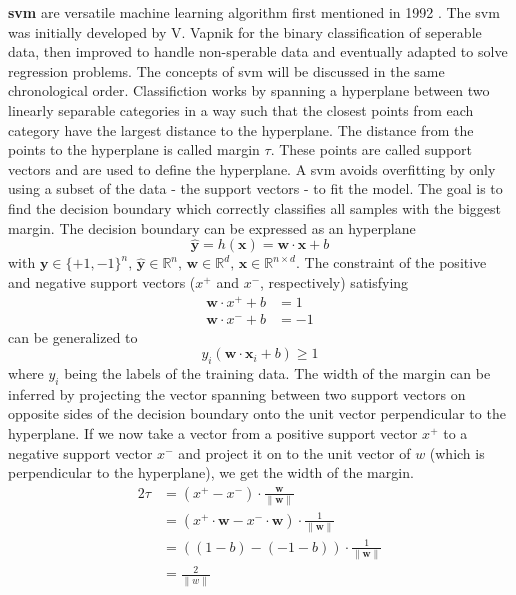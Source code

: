 \textbf{\Gls{svm}} are versatile machine learning algorithm first mentioned in 1992\cite{boser1992training} . 
%
The \gls{svm} was initially developed by V. Vapnik for the binary classification of seperable data, then improved to handle non-sperable data and eventually adapted to solve regression problems.
The concepts of \gls{svm} will be discussed in the same chronological order. 
%
Classifiction works by spanning a hyperplane between two linearly separable categories in a way such that the closest points from each category have the largest distance to the hyperplane. 
The distance from the points to the hyperplane is called margin $\tau$.
These points are called support vectors and are used to define the hyperplane.
A \gls{svm} avoids overfitting by only using a subset of the data - the support vectors - to fit the model. 
The goal is to find the decision boundary which correctly classifies all samples with the biggest margin. 
%
The decision boundary can be expressed as an hyperplane
\begin{equation}
	\hat{\mathbf{y}} = h(\mathbf{x}) = \mathbf{w} \cdot \mathbf{x} + b
\end{equation}
with $
\mathbf{y} \in \lbrace +1, -1 \rbrace^n ,\,
\hat{\mathbf{y}} \in \mathbb{R}^n ,\,
\mathbf{w} \in \mathbb{R}^d ,\,
\mathbf{x} \in \mathbb{R}^{n \times d} 
$.
The constraint of the positive and negative support vectors ($x^+$ and $x^-$, respectively) satisfying
\begin{align}
	\mathbf{w} \cdot x^+ + b &= 1 \\
	\mathbf{w} \cdot x^- + b &= -1 
\end{align}
can be generalized to 
\begin{equation}
	\label{eq:svm01}
	y_i(\mathbf{w} \cdot \mathbf{x}_i + b ) \geqslant 1 %
\end{equation}
where $y_i$ being the labels of the training data. 
The width of the margin can be inferred by projecting the vector spanning between two support vectors 
on opposite sides of the decision boundary onto the unit vector perpendicular to the hyperplane. 
If we now take a vector from a positive support vector $x^+$ to a negative support vector $x^-$ and project it on to the unit vector of $w$ (which is perpendicular to the hyperplane), 
we get the width of the margin. 
\iffalse
\begin{equation}
	\label{eq:svm02}
	\begin{aligned} 
		2\tau &= (x^+ - x^-) \cdot \frac{\mathbf{w}}{\|\mathbf{w}\|} \\
			&= (x^+ \cdot \mathbf{w} - x^-\cdot \mathbf{w} ) \cdot \frac{1}{\|\mathbf{w}\|} \\
			&= ( (1-b) - (-1-b) ) \cdot \frac{1}{\|\mathbf{w}\|} \\
			&= \frac{2}{\|w\|}
	\end{aligned}
\end{equation}
